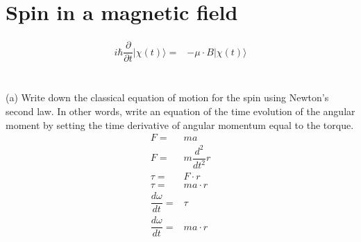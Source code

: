 \documentclass[12pt, a4paper]{article}
\begin{document}
\section{Spin in a magnetic field}

\begin{align*}
i\hbar \dfrac{\partial}{\partial t} |\chi(t)\rangle =& -\mu\cdot B|\chi(t)\rangle
\end{align*}\\
\\
(a) Write down the classical equation of motion for the spin using Newton's second law. In other words, write an equation of the time evolution of the angular moment by setting the time
derivative of angular momentum equal to the torque.
\begin{align*}
F =& ma
\\
F =& m \dfrac{d^2}{dt^2}r
\\
\tau =& F\cdot r
\\
\tau =& ma\cdot r
\\
\dfrac{d\omega}{dt} =& \tau
\\
\dfrac{d\omega}{dt} =& ma\cdot r
\end{align*}
\end{document}
